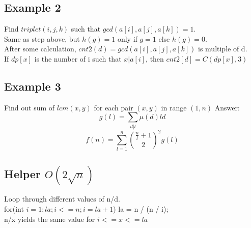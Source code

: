 	\subsection{Example 2}
	Find $triplet(i,j,k)$ such that $gcd(a[i], a[j], a[k])=1$. \\
	Same as step above, but $h(g) = 1$ only if $g=1$ else $h(g)=0$. \\
	After some calculation, $cnt2(d) = gcd(a[i], a[j], a[k])$ is multiple of d. \\
	If $dp[x]$ is the number of i such that $x | a[i]$, then $cnt2[d] = C(dp[x], 3)$
	
	\subsection{Example 3}
	Find out sum of $lcm(x,y)$ for each pair $(x,y)$ in range $(1,n)$
	Answer: 
	\[g(l) = \sum_{d|l} \mu(d)ld\]
	\[f(n)=\sum_{l=1}^{n}\binom{\frac{n}{l}+1}{2}^2g(l)\]
				
	\subsection{Helper $O(2\sqrt{n})$}
	Loop through different values of n/d. \\
	for(int $i = 1; la; i <= n; i = la+1$)  
	la = n / (n / i); \\
	n/x yields the same value for $i <= x <= la$
